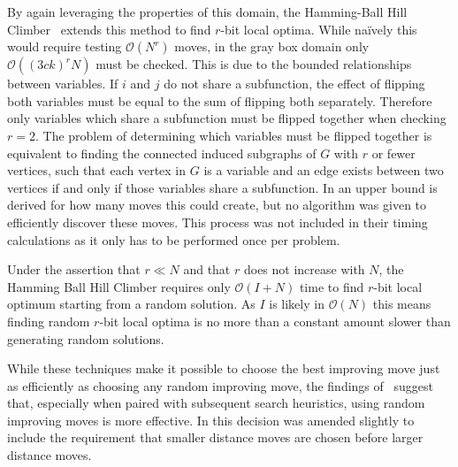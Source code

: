 \documentclass{sig-alternate}
\newcommand{\BigO}[1]{$\mathcal{O}{(#1)}$}
\begin{document}
By again leveraging the properties of this domain, the Hamming-Ball Hill Climber~\cite{chicano:2014:ball} extends this
method to find $r$-bit local optima. While na\"ively this would require testing \BigO{N^r} moves, in the gray box domain only
\BigO{(3ck)^rN} must be checked. This is due to the bounded relationships between variables.
If $i$ and $j$ do not share a subfunction, the effect of flipping both variables
must be equal to the sum of flipping both separately. Therefore only variables which share
a subfunction must be flipped together when checking $r=2$. The problem of determining
which variables must be flipped together is equivalent to finding the connected induced
subgraphs of $G$ with $r$ or fewer vertices, such that each vertex in $G$ is a variable
and an edge exists between two vertices if and only if those variables share a subfunction.
In \cite{chicano:2014:ball} an upper bound is derived for how many moves this could create,
but no algorithm was given to efficiently discover these moves. This process was not included
in their timing calculations as it only has to be performed once per problem.

Under the assertion that $r \ll N$ and that $r$ does not increase with $N$, the Hamming
Ball Hill Climber requires only \BigO{I+N} time to find $r$-bit local optimum starting
from a random solution. As $I$ is likely in \BigO{N} this means finding random $r$-bit local optima
is no more than a constant amount slower than generating random solutions.

While these techniques make it possible to choose the best improving move just as efficiently
as choosing any random improving move, the findings of~\cite{whitley:2013:greedy} suggest that,
especially when paired with subsequent search heuristics, using random improving moves is more effective.
In \cite{chicano:2014:ball} this decision was amended slightly to include the requirement that smaller
distance moves are chosen before larger distance moves.
\end{document}
